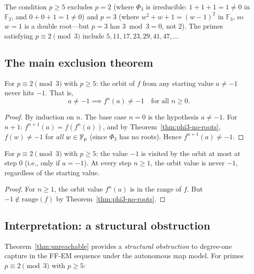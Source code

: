 \begin{remark}
The condition $p \geq 5$ excludes $p = 2$ (where $\Phi_3$ is irreducible:
$1 + 1 + 1 = 1 \neq 0$ in $\mathbb{F}_2$, and $0 + 0 + 1 = 1 \neq 0$)
and $p = 3$ (where $w^2 + w + 1 = (w-1)^2$ in $\mathbb{F}_3$, so $w = 1$
is a double root---but $p = 3$ has $3 \bmod 3 = 0$, not $2$).
The primes satisfying $p \equiv 2 \pmod{3}$ include
$5, 11, 17, 23, 29, 41, 47, \ldots$
\end{remark}

\subsection{The main exclusion theorem}

\begin{theorem}[Unreachability of $-1$]\label{thm:unreachable}
For $p \equiv 2 \pmod{3}$ with $p \geq 5$: the orbit of $f$ from any
starting value $a \neq -1$ never hits $-1$. That is,
\[
  a \neq -1 \implies f^n(a) \neq -1 \quad \text{for all } n \geq 0.
\]
\end{theorem}

\begin{proof}
By induction on $n$. The base case $n = 0$ is the hypothesis $a \neq -1$.
For $n + 1$: $f^{n+1}(a) = f(f^n(a))$, and by
Theorem~\ref{thm:phi3-no-roots}, $f(w) \neq -1$ for \emph{all} $w \in \mathbb{F}_p$
(since $\Phi_3$ has no roots). Hence $f^{n+1}(a) \neq -1$.
\end{proof}

\begin{corollary}\label{cor:visited-once}
For $p \equiv 2 \pmod{3}$ with $p \geq 5$: the value $-1$ is visited by
the orbit at most at step $0$ (i.e., only if $a = -1$). At every step
$n \geq 1$, the orbit value is never $-1$, regardless of the starting value.
\end{corollary}

\begin{proof}
For $n \geq 1$, the orbit value $f^n(a)$ is in the range of $f$. But
$-1 \notin \mathrm{range}(f)$ by Theorem~\ref{thm:phi3-no-roots}.
\end{proof}

\subsection{Interpretation: a structural obstruction}

Theorem~\ref{thm:unreachable} provides a \emph{structural obstruction} to
degree-one capture in the FF-EM sequence under the autonomous map model.
For primes $p \equiv 2 \pmod{3}$ with $p \geq 5$:

